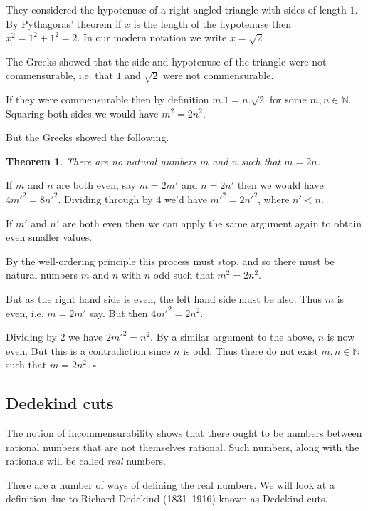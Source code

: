 \documentclass[10pt]{article}
\newcommand{\N}{\mathbb{N}}
\newcommand{\qed}{\square}
\newtheorem{theorem}{Theorem}[section]
\newenvironment{proof}[1][Proof]{\begin{trivlist}
\item[\hskip \labelsep {\bfseries #1}]}{\end{trivlist}}
\begin{document}
They considered the hypotenuse of a right angled triangle with sides of length $1$. By Pythagoras' theorem if $x$ is the length of the hypotenuse then $x^2 = 1^2 + 1^2 = 2$. In our modern notation we write $x = \sqrt{2}$.

The Greeks showed that the side and hypotenuse of the triangle were not commensurable, i.e. that $1$ and $\sqrt{2}$ were not commensurable.

If they were commensurable then by definition $m.1 = n.\sqrt{2}$ for some $m, n \in \N$. Squaring both sides we would have $m^2 = 2n^2$.

But the Greeks showed the following.

\begin{theorem}
There are no natural numbers $m$ and $n$ such that $m = 2n$.
\end{theorem}

\begin{proof}
If $m$ and $n$ are both even, say $m = 2m'$ and $n = 2n'$ then we would have $4m'^2 = 8n'^2$. Dividing through by $4$ we'd have $m'^2 = 2n'^2$, where $n' < n$.

If $m'$ and $n'$ are both even then we can apply the same argument again to obtain even smaller values.

By the well-ordering principle this process must stop, and so there must be natural numbers $m$ and $n$ with $n$ odd such that $m^2 = 2n^2$.

But as the right hand side is even, the left hand side must be also. Thus $m$ is even, i.e. $m = 2m'$ say. But then $4m'^2 = 2n^2$.

Dividing by $2$ we have $2m'^2 = n^2$. By a similar argument to the above, $n$ is now even. But this is a contradiction since $n$ is odd. Thus there do not exist $m, n \in \N$ such that $m = 2n^2$. $\qed$
\end{proof}

\subsection{Dedekind cuts}

The notion of incommensurability shows that there ought to be numbers between rational numbers that are not themselves rational. Such numbers, along with the rationals will be called \emph{real} numbers.

There are a number of ways of defining the real numbers. We will look at a definition due to Richard Dedekind (1831--1916) known as Dedekind cuts.
\end{document}

